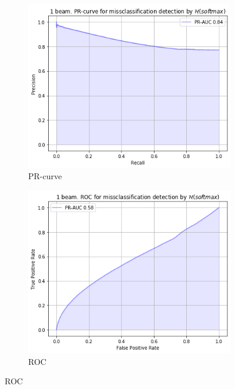 \documentclass[a4paper,14pt]{extarticle}
\begin{document}
		
	\begin{figure}[t]
		\begin{subfigure}{.45\textwidth}
			\centering
			\includegraphics[width=1\textwidth]{images/malinin_eq_tu.png}
			\caption{PR-curve}
		\end{subfigure}
		\begin{subfigure}{.45\textwidth}
			\centering
			\includegraphics[width=1\textwidth]{images/malinin_eq_tu_roc.png}
			\caption{ROC}
		\end{subfigure}
	\end{figure}	
\end{document}

